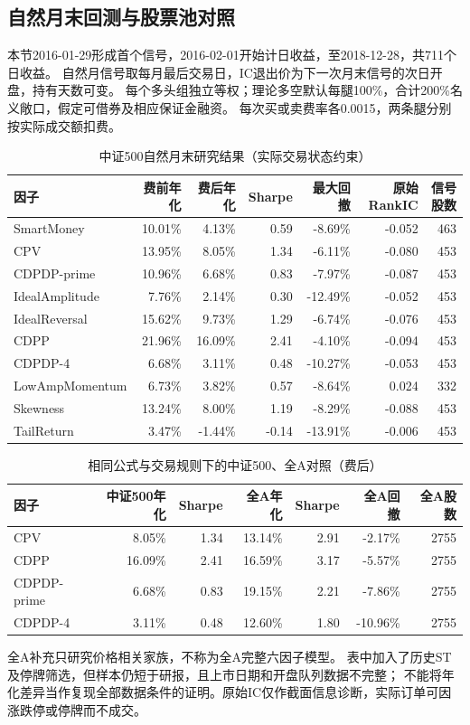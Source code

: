 \documentclass[UTF8,zihao=-4,fontset=fandol]{ctexart}
\begin{document}
\subsection{自然月末回测与股票池对照}
本节2016-01-29形成首个信号，2016-02-01开始计日收益，至2018-12-28，共711个日收益。
自然月信号取每月最后交易日，IC退出价为下一次月末信号的次日开盘，持有天数可变。
每个多头组独立等权；理论多空默认每腿100\%，合计200\%名义敞口，假定可借券及相应保证金融资。
每次买或卖费率各0.0015，两条腿分别按实际成交额扣费。

\begin{table}[H]\centering\small
\caption{中证500自然月末研究结果（实际交易状态约束）}
\setlength{\tabcolsep}{4pt}
\begin{tabular}{lrrrrrr}\toprule
因子 & 费前年化 & 费后年化 & Sharpe & 最大回撤 & 原始RankIC & 信号股数\\\midrule
SmartMoney & 10.01\% & 4.13\% & 0.59 & -8.69\% & -0.052 & 463 \\
CPV & 13.95\% & 8.05\% & 1.34 & -6.11\% & -0.080 & 453 \\
CDPDP-prime & 10.96\% & 6.68\% & 0.83 & -7.97\% & -0.087 & 453 \\
IdealAmplitude & 7.76\% & 2.14\% & 0.30 & -12.49\% & -0.052 & 453 \\
IdealReversal & 15.62\% & 9.73\% & 1.29 & -6.74\% & -0.076 & 453 \\
CDPP & 21.96\% & 16.09\% & 2.41 & -4.10\% & -0.094 & 453 \\
CDPDP-4 & 6.68\% & 3.11\% & 0.48 & -10.27\% & -0.053 & 453 \\
LowAmpMomentum & 6.73\% & 3.82\% & 0.57 & -8.64\% & 0.024 & 332 \\
Skewness & 13.24\% & 8.00\% & 1.19 & -8.29\% & -0.088 & 453 \\
TailReturn & 3.47\% & -1.44\% & -0.14 & -13.91\% & -0.006 & 453 \\
\bottomrule
\end{tabular}\end{table}

\begin{table}[H]\centering\small
\caption{相同公式与交易规则下的中证500、全A对照（费后）}
\setlength{\tabcolsep}{4pt}
\begin{tabular}{lrrrrrr}\toprule
因子 & 中证500年化 & Sharpe & 全A年化 & Sharpe & 全A回撤 & 全A股数\\\midrule
CPV & 8.05\% & 1.34 & 13.14\% & 2.91 & -2.17\% & 2755 \\
CDPP & 16.09\% & 2.41 & 16.59\% & 3.17 & -5.57\% & 2755 \\
CDPDP-prime & 6.68\% & 0.83 & 19.15\% & 2.21 & -7.86\% & 2755 \\
CDPDP-4 & 3.11\% & 0.48 & 12.60\% & 1.80 & -10.96\% & 2755 \\
\bottomrule
\end{tabular}\end{table}
全A补充只研究价格相关家族，不称为全A完整六因子模型。
表中加入了历史ST及停牌筛选，但样本仍短于研报，且上市日期和开盘队列数据不完整；
不能将年化差异当作复现全部数据条件的证明。原始IC仅作截面信息诊断，实际订单可因涨跌停或停牌而不成交。
\end{document}
